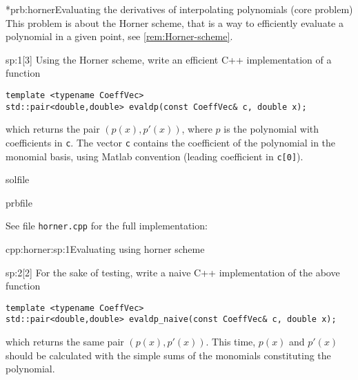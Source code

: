 
\begin{samproblem}*{prb:horner}{Evaluating the derivatives of interpolating polynomials (core problem)}{
  This problem is about the Horner scheme, that is a way to efficiently evaluate a polynomial in a given point, see \cref{rem:Horner-scheme}.
}

\begin{subproblem}{sp:1}[3]
  Using the Horner scheme, write an efficient C++ implementation of a function
  \begin{lstlisting}[style=cpp]
template <typename CoeffVec>
std::pair<double,double> evaldp(const CoeffVec& c, double x);
  \end{lstlisting}
  which returns the pair $(p(x),p'(x))$, where $p$ is the polynomial with coefficients in \texttt{c}. 
  The vector \texttt{c} contains the coefficient of the polynomial in the monomial basis, using Matlab convention (leading coefficient in \texttt{c[0]}).

  \begin{samwriteprbpart}{solfile}
    \begin{writeverbatim}{prbfile}
      \begin{samsolution}
        See file \texttt{horner.cpp} for the full implementation:
        \begin{samcode}[C++-code]{cpp:horner:sp:1}{Evaluating using horner scheme}
        \end{samcode}
     \end{samsolution}
    \end{writeverbatim}
  \end{samwriteprbpart}

\end{subproblem}

\begin{subproblem}{sp:2}[2]
  For the sake of testing, write a naive C++ implementation of the above function
  \begin{lstlisting}
template <typename CoeffVec>
std::pair<double,double> evaldp_naive(const CoeffVec& c, double x);
  \end{lstlisting}
  which returns the same pair $(p(x),p'(x))$. This time, $p(x)$ and $p'(x)$ should be calculated with the simple sums of the monomials 
  constituting the polynomial.


\end{subproblem}
\end{samproblem}
